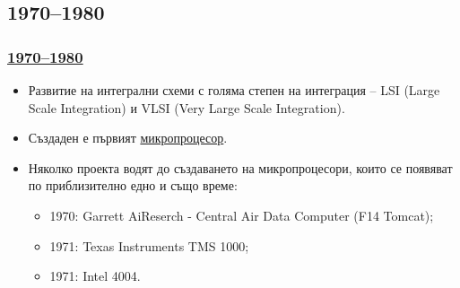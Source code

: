 \documentclass[ignorenonframetext, hyperref=unicode]{beamer}
\begin{document}
\subsection{1970--1980}

\begin{frame}
\frametitle{\href{http://en.wikipedia.org/wiki/History_of_computing_hardware_(1960s-present)}{
1970--1980}}
\begin{itemize}
  \item Развитие на интегрални схеми с голяма степен на интеграция -- LSI (Large
  Scale Integration) и VLSI (Very Large Scale Integration).
  \item Създаден е първият
  \href{http://en.wikipedia.org/wiki/Microprocessor}{микропроцесор}.
  \item Няколко проекта водят до създаването на микропроцесори, които се
  появяват по приблизително едно и също време:
  \begin{itemize}
    \item 1970: Garrett AiReserch - Central Air Data Computer (F14 Tomcat);
    \item 1971: Texas Instruments TMS 1000;
    \item 1971: Intel 4004.
  \end{itemize}
\end{itemize}
\end{frame}
  
\end{document}
